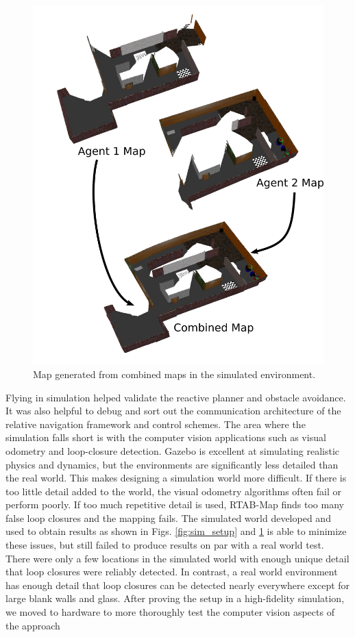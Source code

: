 \documentclass[letterpaper, 10 pt, conference]{ieeeconf}  %
\begin{document}
\begin{figure}
\centering
\includegraphics[width=0.7\linewidth]{sim_map}
\caption{Map generated from combined maps in the simulated environment.}
\label{fig:sim_map}
\end{figure}

Flying in simulation helped validate the reactive planner and obstacle avoidance. It was also helpful to debug and sort out the communication architecture of the relative navigation framework and control schemes. The area where the simulation falls short is with the computer vision applications such as visual odometry and loop-closure detection. Gazebo is excellent at simulating realistic physics and dynamics, but the environments are significantly less detailed than the real world. This makes designing a simulation world more difficult. If there is too little detail added to the world, the visual odometry algorithms often fail or perform poorly. If too much repetitive detail is used, RTAB-Map finds too many false loop closures and the mapping fails. The simulated world developed and used to obtain results as shown in Figs. \ref{fig:sim_setup} and \ref{fig:sim_map} is able to minimize these issues, but still failed to produce results on par with a real world test. There were only a few locations in the simulated world with enough unique detail that loop closures were reliably detected. In contrast, a real world environment has enough detail that loop closures can be detected nearly everywhere except for large blank walls and glass. After proving the setup in a high-fidelity simulation, we moved to hardware to more thoroughly test the computer vision aspects of the approach
\end{document}
